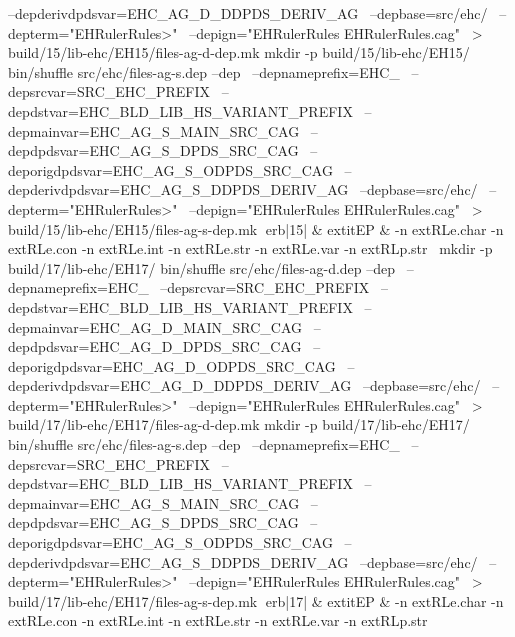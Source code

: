 	  --depderivdpdsvar=EHC_AG_D_DDPDS_DERIV_AG \
	  --depbase=src/ehc/ \
	  --depterm="EHRulerRules>" \
	  --depign="EHRulerRules EHRulerRules.cag" \
	    > build/15/lib-ehc/EH15/files-ag-d-dep.mk
mkdir -p build/15/lib-ehc/EH15/
bin/shuffle src/ehc/files-ag-s.dep --dep \
	  --depnameprefix=EHC_ \
	  --depsrcvar=SRC_EHC_PREFIX \
	  --depdstvar=EHC_BLD_LIB_HS_VARIANT_PREFIX \
	  --depmainvar=EHC_AG_S_MAIN_SRC_CAG \
	  --depdpdsvar=EHC_AG_S_DPDS_SRC_CAG \
	  --deporigdpdsvar=EHC_AG_S_ODPDS_SRC_CAG \
	  --depderivdpdsvar=EHC_AG_S_DDPDS_DERIV_AG \
	  --depbase=src/ehc/ \
	  --depterm="EHRulerRules>" \
	  --depign="EHRulerRules EHRulerRules.cag" \
	    > build/15/lib-ehc/EH15/files-ag-s-dep.mk
erb|15| & 	extit{EP} & 
-n 	extRL{e.char}\hspace{.5em} 
-n 	extRL{e.con}\hspace{.5em} 
-n 	extRL{e.int}\hspace{.5em} 
-n 	extRL{e.str}\hspace{.5em} 
-n 	extRL{e.var}\hspace{.5em} 
-n 	extRL{p.str}\hspace{.5em} 
\
mkdir -p build/17/lib-ehc/EH17/
bin/shuffle src/ehc/files-ag-d.dep --dep \
	  --depnameprefix=EHC_ \
	  --depsrcvar=SRC_EHC_PREFIX \
	  --depdstvar=EHC_BLD_LIB_HS_VARIANT_PREFIX \
	  --depmainvar=EHC_AG_D_MAIN_SRC_CAG \
	  --depdpdsvar=EHC_AG_D_DPDS_SRC_CAG \
	  --deporigdpdsvar=EHC_AG_D_ODPDS_SRC_CAG \
	  --depderivdpdsvar=EHC_AG_D_DDPDS_DERIV_AG \
	  --depbase=src/ehc/ \
	  --depterm="EHRulerRules>" \
	  --depign="EHRulerRules EHRulerRules.cag" \
	    > build/17/lib-ehc/EH17/files-ag-d-dep.mk
mkdir -p build/17/lib-ehc/EH17/
bin/shuffle src/ehc/files-ag-s.dep --dep \
	  --depnameprefix=EHC_ \
	  --depsrcvar=SRC_EHC_PREFIX \
	  --depdstvar=EHC_BLD_LIB_HS_VARIANT_PREFIX \
	  --depmainvar=EHC_AG_S_MAIN_SRC_CAG \
	  --depdpdsvar=EHC_AG_S_DPDS_SRC_CAG \
	  --deporigdpdsvar=EHC_AG_S_ODPDS_SRC_CAG \
	  --depderivdpdsvar=EHC_AG_S_DDPDS_DERIV_AG \
	  --depbase=src/ehc/ \
	  --depterm="EHRulerRules>" \
	  --depign="EHRulerRules EHRulerRules.cag" \
	    > build/17/lib-ehc/EH17/files-ag-s-dep.mk
erb|17| & 	extit{EP} & 
-n 	extRL{e.char}\hspace{.5em} 
-n 	extRL{e.con}\hspace{.5em} 
-n 	extRL{e.int}\hspace{.5em} 
-n 	extRL{e.str}\hspace{.5em} 
-n 	extRL{e.var}\hspace{.5em} 
-n 	extRL{p.str}\hspace{.5em} 
